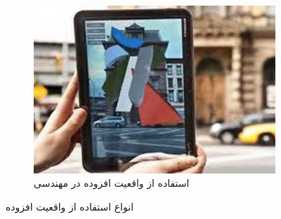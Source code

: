 \begin{figure}
		\begin{subfigure}[b]{0.4\textwidth}
			\includegraphics[width=\textwidth]{image/AR_architecture_by_Re+Public}
			\caption{استفاده از واقعیت افزوده در مهندسی
			\\
			\cite{Fjeld}}
			\label{fig:mouse}
		\end{subfigure}
		\caption{انواع استفاده از واقعیت افزوده}\label{fig:َARType}
	\end{figure}

